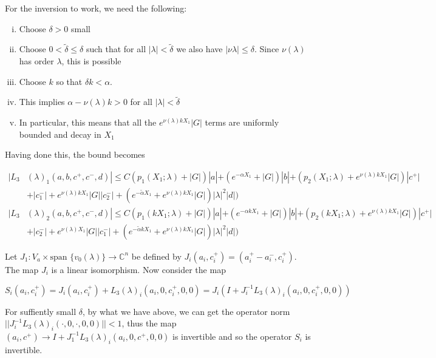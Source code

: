 \documentclass[12pt]{article}
\def\C{{\mathbb C}}
\begin{document}
\begin{enumerate}
For the inversion to work, we need the following:

\begin{enumerate}[(i)]
\item Choose $\delta > 0$ small
\item Choose $0 < \tilde{\delta} \leq \delta$ such that for all $|\lambda| < \tilde{\delta}$ we also have $|\nu{\lambda}| \leq \delta$. Since $\nu(\lambda)$ has order $\lambda$, this is possible
\item Choose $k$ so that $\delta k < \alpha$. 
\item This implies $\alpha - \nu(\lambda) k > 0$ for all $|\lambda| < \tilde{\delta}$
\item In particular, this means that all the $e^{\nu(\lambda)k X_1} |G|$ terms are uniformly bounded and decay in $X_1$
\end{enumerate}

Having done this, the bound becomes

\begin{align*}
|L_3&(\lambda)_1(a, b, c^+, c^-, d)| \leq C (p_1(X_1; \lambda) + |G|)|a| + (e^{-\alpha X_1} + |G|) |b| + ( p_2(X_1; \lambda) + e^{\nu(\lambda) k X_1 } |G|) |c^+| \\
&+ |c_1^-| + e^{\nu(\lambda)k X_1} |G||c_2^-| + (e^{-\tilde{\alpha} X_1} + e^{\nu(\lambda)k X_1} |G|) |\lambda|^2 |d| ) \\
|L_3&(\lambda)_2(a, b, c^+, c^-, d)| \leq C (p_1(k X_1; \lambda) + |G|)|a| + (e^{-\alpha k X_1} + |G|) |b| + ( p_2(k X_1; \lambda) + e^{\nu(\lambda) k X_1 } |G|) |c^+| \\
&+ |c_2^-| + e^{\nu(\lambda)X_1} |G||c_1^-| + (e^{-\tilde{\alpha} k X_1} + e^{\nu(\lambda)k X_1} |G|) |\lambda|^2 |d| )
\end{align*}

Let $J_1: V_a \times \text{span }\{v_0(\lambda)\} \rightarrow \C^n$ be defined by $J_i(a_i, c_i^+) = (a_i^+ - a_i^-, c_i^+)$. The map $J_i$ is a linear isomorphism. Now consider the map

\[
S_i(a_i, c_i^+) = J_i (a_i, c_i^+) + L_3(\lambda)_i(a_i, 0, c_i^+, 0, 0) = J_i( I + J_i^{-1} L_3(\lambda)_i(a_i, 0, c_i^+, 0, 0))
\]


For suffiently small $\delta$, by what we have above, we can get the operator norm $||J_i^{-1} L_3(\lambda)_i(\cdot, 0, \cdot, 0, 0)|| < 1$, thus the map $(a_i, c^+) \rightarrow I + J_1^{-1} L_3(\lambda)_i(a_i, 0, c^+, 0, 0)$ is invertible and so the operator $S_i$ is invertible.\\


\end{enumerate}
\end{document}
